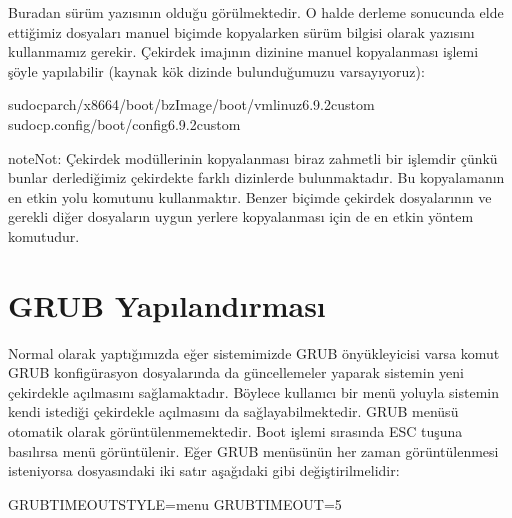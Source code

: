 \documentclass[a4paper,10pt,turkish]{sphinxmanual}
\begin{document}
\sphinxAtStartPar
Buradan sürüm yazısının  olduğu görülmektedir. O halde derleme sonucunda elde
ettiğimiz dosyaları manuel biçimde kopyalarken sürüm bilgisi olarak  yazısını
kullanmamız gerekir. Çekirdek imajının  dizinine manuel kopyalanması işlemi şöyle
yapılabilir (kaynak kök dizinde bulunduğumuzu varsayıyoruz):

\begin{sphinxVerbatim}[commandchars=\\\{\}]
\PYGZdl{}sudocparch/x86\PYGZus{}64/boot/bzImage/boot/vmlinuz\PYGZhy{}6.9.2\PYGZhy{}custom
\PYGZdl{}sudocp.config/boot/config\PYGZhy{}6.9.2\PYGZhy{}custom
\end{sphinxVerbatim}

\begin{sphinxadmonition}{note}{Not:}
\sphinxAtStartPar
Çekirdek modüllerinin kopyalanması biraz zahmetli bir işlemdir çünkü bunlar derlediğimiz
çekirdekte farklı dizinlerde bulunmaktadır. Bu kopyalamanın en etkin yolu 
komutunu kullanmaktır. Benzer biçimde çekirdek dosyalarının ve gerekli diğer dosyaların uygun
yerlere kopyalanması için de en etkin yöntem  komutudur.
\end{sphinxadmonition}


\section{GRUB Yapılandırması}
\label{\detokenize{kernelcompilation:grub-yapilandirmasi}}
\sphinxAtStartPar
Normal olarak  yaptığımızda eğer sistemimizde GRUB önyükleyicisi varsa komut GRUB
konfigürasyon dosyalarında da güncellemeler yaparak sistemin yeni çekirdekle açılmasını sağlamaktadır.
Böylece kullanıcı bir menü yoluyla sistemin kendi istediği çekirdekle açılmasını da sağlayabilmektedir.
GRUB menüsü otomatik olarak görüntülenmemektedir. Boot işlemi sırasında ESC tuşuna basılırsa menü
görüntülenir. Eğer GRUB menüsünün her zaman görüntülenmesi isteniyorsa 
dosyasındaki iki satır aşağıdaki gibi değiştirilmelidir:

\begin{sphinxVerbatim}[commandchars=\\\{\}]
GRUB\PYGZus{}TIMEOUT\PYGZus{}STYLE=menu
GRUB\PYGZus{}TIMEOUT=5
\end{sphinxVerbatim}
\end{document}
